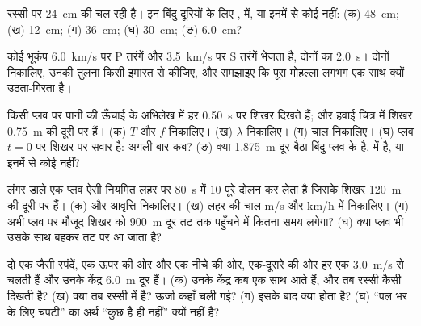 \begin{exercise}[$\star\star$]\label{exo:g12:mechanical-waves:10}
रस्सी पर  \qty{24}{cm} की  चल रही है। इन
बिंदु-दूरियों के लिए ,  में, या इनमें से कोई
नहीं: (क) \qty{48}{cm}; (ख) \qty{12}{cm}; (ग) \qty{36}{cm}; (घ) \qty{30}{cm}; (ङ) \qty{6.0}{cm}?
\end{exercise}

\begin{exercise}[$\star\star$]\label{exo:g12:mechanical-waves:11}
कोई भूकंप \qty{6.0}{km/s} पर P तरंगें और \qty{3.5}{km/s} पर S तरंगें
भेजता है, दोनों का  \qty{2.0}{s}। दोनों 
निकालिए, उनकी तुलना किसी इमारत से कीजिए, और समझाइए कि पूरा मोहल्ला लगभग एक
साथ क्यों उठता-गिरता है।
\end{exercise}

\begin{exercise}[$\star\star\star$]\label{exo:g12:mechanical-waves:12}
किसी प्लव पर पानी की ऊँचाई के अभिलेख में हर \qty{0.50}{s} पर शिखर दिखते हैं; और
हवाई चित्र में शिखर \qty{0.75}{m} की दूरी पर हैं। (क) $T$ और $f$ निकालिए।
(ख) $\lambda$ निकालिए। (ग) चाल निकालिए। (घ) प्लव $t = 0$ पर शिखर पर सवार है:
अगली बार कब? (ङ) क्या \qty{1.875}{m} दूर बैठा बिंदु प्लव के  है,
 में है, या इनमें से कोई नहीं?
\end{exercise}

\begin{exercise}[$\star\star\star$]\label{exo:g12:mechanical-waves:13}
लंगर डाले एक प्लव ऐसी नियमित लहर पर \qty{80}{s} में $10$ पूरे दोलन कर लेता है
जिसके शिखर \qty{120}{m} की दूरी पर हैं। (क)  और
आवृत्ति निकालिए। (ख) लहर की चाल \unit{m/s} और \unit{km/h} में निकालिए।
(ग) अभी प्लव पर मौजूद शिखर को \qty{900}{m} दूर तट तक पहुँचने में कितना समय लगेगा?
(घ) क्या प्लव भी उसके साथ बहकर तट पर आ जाता है?
\end{exercise}

\begin{exercise}[$\star\star\star$]\label{exo:g12:mechanical-waves:14}
दो एक जैसी स्पंदें, एक ऊपर की ओर और एक नीचे की ओर, एक-दूसरे की ओर हर एक
\qty{3.0}{m/s} से चलती हैं और उनके केंद्र \qty{6.0}{m} दूर हैं। (क) उनके केंद्र कब एक
साथ आते हैं, और तब रस्सी कैसी दिखती है? (ख) क्या तब रस्सी  में है?
ऊर्जा कहाँ चली गई? (ग) इसके बाद क्या होता है? (घ) ``पल भर के लिए
चपटी'' का अर्थ ``कुछ है ही नहीं'' क्यों नहीं है?
\end{exercise}

